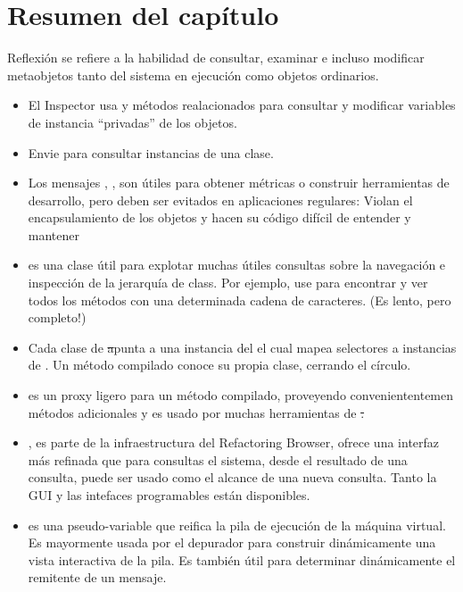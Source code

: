 \documentclass[a4paper,10pt,twoside]{book}
\begin{document}

\section{Resumen del cap\'itulo}

Reflexi\'on se refiere a la habilidad de consultar, examinar e incluso modificar metaobjetos tanto del sistema en ejecuci\'on como objetos ordinarios.

\begin{itemize}
\item El Inspector usa  y m\'etodos realacionados para consultar y modificar variables de instancia ``privadas'' de los objetos.
\item Envie  para consultar instancias de una clase.
\item Los mensajes , ,  \etc  son \'utiles para obtener m\'etricas o construir herramientas de desarrollo, pero deben ser evitados en aplicaciones regulares: Violan el encapsulamiento de los objetos y hacen su c\'odigo dif\'icil de entender y mantener
\item {} es una clase \'util para explotar muchas \'utiles consultas sobre la navegaci\'on e inspecci\'on de la jerarqu\'ia de \ct class. Por ejemplo, use  para encontrar y ver todos los m\'etodos con una determinada cadena de caracteres. (Es lento, pero completo!)
\item Cada clase de \st apunta a una instancia del  el cual mapea selectores a instancias de . Un m\'etodo compilado conoce su propia clase, cerrando el c\'irculo.
\item {} es un proxy ligero para un m\'etodo compilado, proveyendo conveniententemen m\'etodos adicionales y es usado por muchas herramientas de \st .
\item {}, es parte de la infraestructura del Refactoring Browser, ofrece una interfaz m\'as refinada que  para consultas el sistema, desde el resultado de una consulta, puede ser usado como el alcance de una nueva consulta. Tanto la GUI y las intefaces programables est\'an disponibles.
\item {} es una pseudo-variable que reifica la pila de ejecuci\'on de la m\'aquina virtual. Es mayormente usada por el depurador para construir din\'amicamente una vista interactiva de la pila. Es tambi\'en \'util para determinar din\'amicamente el remitente de un mensaje.

\end{itemize}
\end{document}
